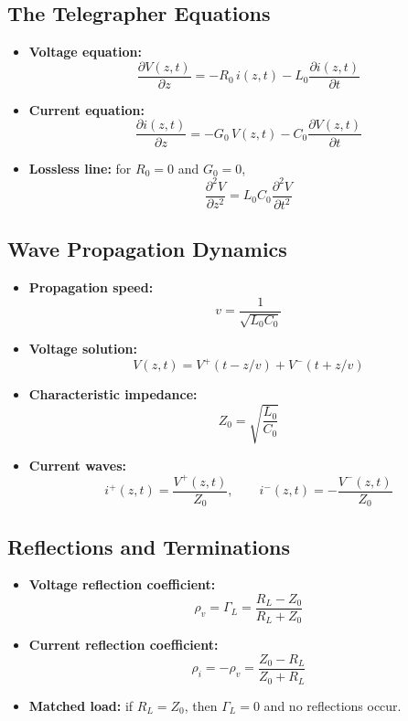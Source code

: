\documentclass{article}
\begin{document}
\subsection*{The Telegrapher Equations}
\begin{itemize}
    \item \textbf{Voltage equation:} 
    \[
    \frac{\partial V(z,t)}{\partial z} = -R_0\, i(z,t) - L_0 \frac{\partial i(z,t)}{\partial t}
    \]
    \item \textbf{Current equation:}
    \[
    \frac{\partial i(z,t)}{\partial z} = -G_0\, V(z,t) - C_0 \frac{\partial V(z,t)}{\partial t}
    \]
    \item \textbf{Lossless line:} for $R_0 = 0$ and $G_0 = 0$,
    \[
    \frac{\partial^2 V}{\partial z^2} = L_0 C_0 \frac{\partial^2 V}{\partial t^2}
    \]
\end{itemize}

\subsection*{Wave Propagation Dynamics}
\begin{itemize}
    \item \textbf{Propagation speed:}
    \[
    v = \frac{1}{\sqrt{L_0 C_0}}
    \]
    \item \textbf{Voltage solution:}
    \[
    V(z,t) = V^+(t - z/v) + V^-(t + z/v)
    \]
    \item \textbf{Characteristic impedance:}
    \[
    Z_0 = \sqrt{\frac{L_0}{C_0}}
    \]
    \item \textbf{Current waves:}
    \[
    i^+(z,t) = \frac{V^+(z,t)}{Z_0}, \qquad
    i^-(z,t) = -\frac{V^-(z,t)}{Z_0}
    \]
\end{itemize}

\subsection*{Reflections and Terminations}
\begin{itemize}
    \item \textbf{Voltage reflection coefficient:}
    \[
    \rho_v = \Gamma_L = \frac{R_L - Z_0}{R_L + Z_0}
    \]
    \item \textbf{Current reflection coefficient:}
    \[
    \rho_i = -\rho_v = \frac{Z_0 - R_L}{Z_0 + R_L}
    \]
    \item \textbf{Matched load:} if $R_L = Z_0$, then $\Gamma_L = 0$ and no reflections occur.
\end{itemize}
\end{document}
